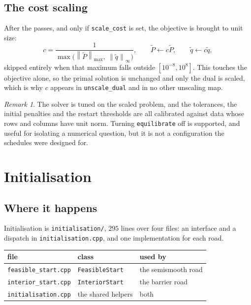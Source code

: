 \documentclass[a4paper,11pt]{book}
\theoremstyle{plain}
\theoremstyle{definition}
\theoremstyle{remark}
\newtheorem{remark}[theorem]{Remark}
\numberwithin{equation}{chapter}
\numberwithin{algorithm}{chapter}
\newcommand{\norm}[1]{\left\|#1\right\|}
\begin{document}
	\section{The cost scaling}

	After the passes, and only if \texttt{scale\_cost} is set, the objective is
	brought to unit size:
	\[
	c=\frac{1}{\max\bigl(\norm{\widetilde P}_{\max},\
		\norm{\widetilde q}_\infty\bigr)},
	\qquad
	\widetilde P\gets c\widetilde P,
	\qquad
	\widetilde q\gets c\widetilde q ,
	\]
	skipped entirely when that maximum falls outside $[10^{-8},10^{8}]$. This
	touches the objective alone, so the primal solution is unchanged and only the
	dual is scaled, which is why $c$ appears in \texttt{unscale\_dual} and in no
	other unscaling map.

\begin{remark}
	The solver is tuned on the scaled problem, and the tolerances, the initial
	penalties and the restart thresholds are all calibrated against data whose
	rows and columns have unit norm. Turning \texttt{equilibrate} off is
	supported, and useful for isolating a numerical question, but it is not a
	configuration the schedules were designed for.
\end{remark}

	\chapter{Initialisation}

	\section{Where it happens}

	Initialisation is \texttt{initialisation/}, $295$ lines over four files:
	an interface and a dispatch in \texttt{initialisation.cpp}, and one
	implementation for each road.

	\begin{table}[H]
		\centering\small
		\begin{tabular}{lll}
			\toprule
			file & class & used by\\
			\midrule
			\texttt{feasible\_start.cpp} & \texttt{FeasibleStart}
			& the semismooth road\\
			\texttt{interior\_start.cpp} & \texttt{InteriorStart}
			& the barrier road\\
			\texttt{initialisation.cpp} & the shared helpers & both\\
			\bottomrule
		\end{tabular}
	\end{table}
\end{document}
